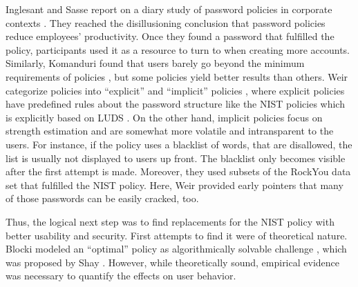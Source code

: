	Inglesant and Sasse report on a diary study of password policies in corporate contexts \cite{Inglesant2010TrueCostOfUnusablePolicies}. They reached the disillusioning conclusion that password policies reduce employees' productivity. Once they found a password that fulfilled the policy, participants used it as a resource to turn to when creating more accounts. Similarly, Komanduri found that users barely go beyond the minimum requirements of policies \cite{Komanduri2011OfPasswordsAndPeople}, but some policies yield better results than others. %
	Weir \etal categorize policies into ``explicit'' and ``implicit'' policies \cite{Weir2010MetricsPolicies}, where explicit policies have predefined rules about the password structure like the NIST policies which is explicitly based on \gls{LUDS} \cite{Wheeler2016zxcvbn}. On the other hand, implicit policies focus on strength estimation and are somewhat more volatile and intransparent to the users. For instance, if the policy uses a blacklist of words, that are disallowed, the list is usually not displayed to users up front. The blacklist only becomes visible after the first attempt is made. Moreover, they used subsets of the RockYou data set that fulfilled the NIST policy. Here, Weir \etal provided early pointers that many of those passwords can be easily cracked, too. 
	
	Thus, the logical next step was to find replacements for the NIST policy with better usability and security. First attempts to find it were of theoretical nature. Blocki \etal modeled an ``optimal'' policy as algorithmically solvable challenge \cite{Blocki2013OptimizingPasswordPolicies}, which was proposed by Shay \cite{Shay2009PolicySimulation}. However, while theoretically sound, empirical evidence was necessary to quantify the effects on user behavior. 

